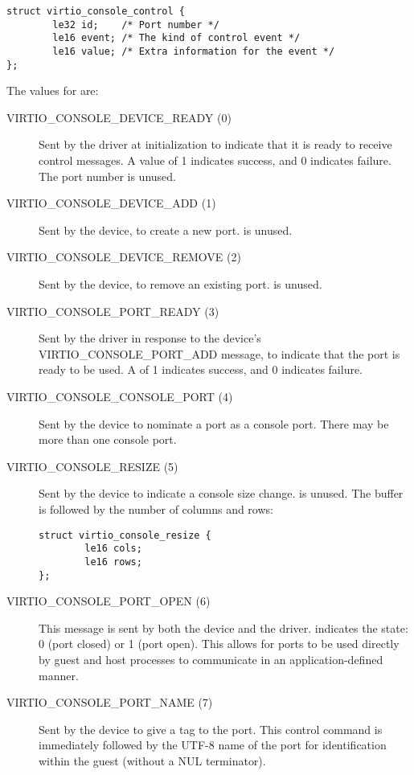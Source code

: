 \begin{lstlisting}
struct virtio_console_control {
        le32 id;    /* Port number */
        le16 event; /* The kind of control event */
        le16 value; /* Extra information for the event */
};
\end{lstlisting}

The values for  are:
\begin{description}
\item [VIRTIO_CONSOLE_DEVICE_READY (0)] Sent by the driver at initialization
  to indicate that it is ready to receive control messages.  A value of
  1 indicates success, and 0 indicates failure.  The port number  is unused.
\item [VIRTIO_CONSOLE_DEVICE_ADD (1)] Sent by the device, to create a new
  port.   is unused.
\item [VIRTIO_CONSOLE_DEVICE_REMOVE (2)] Sent by the device, to remove an
  existing port.  is unused.
\item [VIRTIO_CONSOLE_PORT_READY (3)] Sent by the driver in response
  to the device's VIRTIO_CONSOLE_PORT_ADD message, to indicate that
  the port is ready to be used. A  of 1 indicates success, and 0
  indicates failure.
\item [VIRTIO_CONSOLE_CONSOLE_PORT (4)] Sent by the device to nominate
  a port as a console port.  There may be more than one console port.
\item [VIRTIO_CONSOLE_RESIZE (5)] Sent by the device to indicate
  a console size change.   is unused.  The buffer is followed by the number of columns and rows:
\begin{lstlisting}
struct virtio_console_resize {
        le16 cols;
        le16 rows;
};
\end{lstlisting}
\item [VIRTIO_CONSOLE_PORT_OPEN (6)] This message is sent by both the
  device and the driver.   indicates the state: 0 (port
  closed) or 1 (port open).  This allows for ports to be used directly
  by guest and host processes to communicate in an application-defined
  manner.
\item [VIRTIO_CONSOLE_PORT_NAME (7)] Sent by the device to give a tag
  to the port.  This control command is immediately
  followed by the UTF-8 name of the port for identification
  within the guest (without a NUL terminator).
\end{description}


